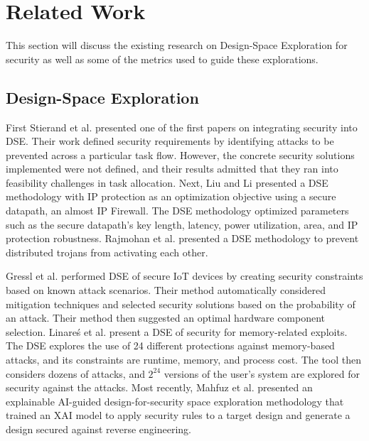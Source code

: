 \section{Related Work} 
\label{sec:relatedWorks}

This section will discuss the existing research on Design-Space Exploration for security as well as some of the metrics used to guide these explorations.

\subsection{Design-Space Exploration}


First Stierand et al. \cite{stierand_integrating_2014} presented one of the first papers on integrating security into DSE. Their work defined security requirements by identifying attacks to be prevented across a particular task flow. However, the concrete security solutions implemented were not defined, and their results admitted that they ran into feasibility challenges in task allocation.
Next, Liu and Li \cite{liu_hardware_2015} presented a DSE methodology with IP protection as an optimization objective using a secure datapath, an almost IP Firewall. The DSE methodology optimized parameters such as the secure datapath’s key length, latency, power utilization, area, and IP protection robustness. 
Rajmohan et al. \cite{rajmohan_hybrid_2020} presented a DSE methodology to prevent distributed trojans from activating each other. 

Gressl et al. \cite{gressl_security_2019,gressl_design_2021} performed DSE of secure IoT devices by creating security constraints based on known attack scenarios. Their method automatically considered mitigation techniques and selected security solutions based on the probability of an attack. Their method then suggested an optimal hardware component selection.
Linare\'s et al. \cite{linares_design_2021} present a DSE of security for memory-related exploits. The DSE explores the use of 24 different protections against memory-based attacks, and its constraints are runtime, memory, and process cost. The tool then considers dozens of attacks, and $2^{24}$ versions of the user’s system are explored for security against the attacks.
Most recently, Mahfuz et al. \cite{mahfuz_x-dfs_2025} presented an explainable AI-guided design-for-security space exploration methodology that trained an XAI model to apply security rules to a target design and generate a design secured against reverse engineering.


